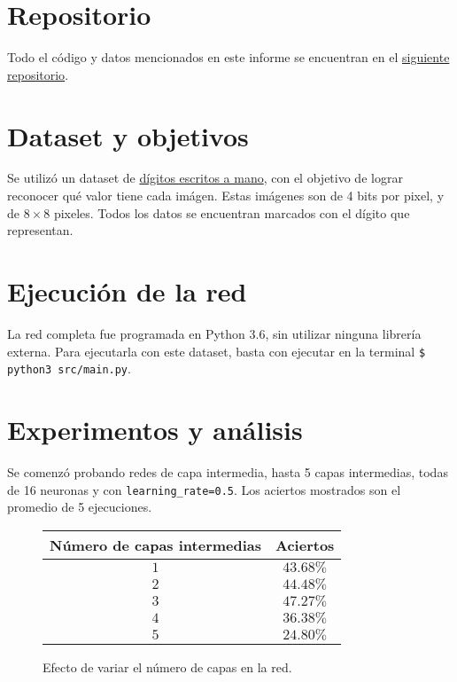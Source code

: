 \documentclass[letterpaper,11pt]{article} %
\begin{document}







\section*{Repositorio}
  Todo el código y datos mencionados en este informe se encuentran en el \href{https://github.com/danno-s/neural-networks}{siguiente repositorio}.

\section*{Dataset y objetivos}
  Se utilizó un dataset de \href{https://archive.ics.uci.edu/ml/datasets/Optical+Recognition+of+Handwritten+Digits}{dígitos escritos a mano}, con el objetivo de lograr reconocer qué valor tiene cada imágen. Estas imágenes son de 4 bits por pixel, y de $8 \times 8$ pixeles. Todos los datos se encuentran marcados con el dígito que representan.

\section*{Ejecución de la red}
  La red completa fue programada en Python 3.6, sin utilizar ninguna librería externa. Para ejecutarla con este dataset, basta con ejecutar en la terminal \texttt{\$ python3 src/main.py}.

\section*{Experimentos y análisis}
  Se comenzó probando redes de capa intermedia, hasta 5 capas intermedias, todas de 16 neuronas y con \texttt{learning\_rate=0.5}. Los aciertos mostrados son el promedio de 5 ejecuciones.

  \begin{figure}
    \centering
    \begin{tabular}{|c|c|}
      \hline
      Número de capas intermedias & Aciertos \\
      \hline
      $1$ & $43.68\%$ \\
      \hline
      $2$ & $44.48\%$ \\
      \hline
      $3$ & $47.27\%$ \\
      \hline
      $4$ & $36.38\%$ \\
      \hline
      $5$ & $24.80\%$ \\
      \hline
    \end{tabular}
    \caption{Efecto de variar el número de capas en la red.}
  \end{figure}
\end{document}
